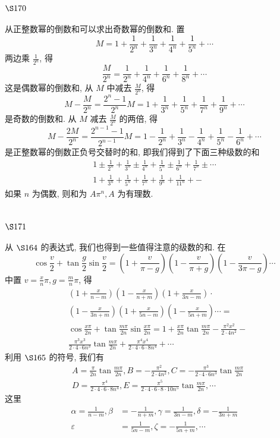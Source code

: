 \section{$\S 170$}

从正整数幂的倒数和可以求出奇数幂的倒数和. 置
\[
M=1+\frac{1}{2^{n}}+\frac{1}{3^{n}}+\frac{1}{4^{n}}+\frac{1}{5^{n}}+\cdots
\]
两边乘 $\frac{1}{2^{n}}$, 得
\[
\frac{M}{2^{n}}=\frac{1}{2^{n}}+\frac{1}{4^{n}}+\frac{1}{6^{n}}+\frac{1}{8^{n}}+\cdots
\]
这是偶数幂的倒数和, 从 $M$ 中减去 $\frac{M}{2^{n}}$, 得
\[
M-\frac{M}{2^{n}}=\frac{2^{n}-1}{2^{n}} M=1+\frac{1}{3^{n}}+\frac{1}{5^{n}}+\frac{1}{7^{n}}+\frac{1}{9^{n}}+\cdots
\]
是奇数的倒数和. 从 $M$ 减去 $\frac{M}{2^{n}}$ 的两倍, 得
\[
M-\frac{2 M}{2^{n}}=\frac{2^{n-1}-1}{2^{n-1}} M=1-\frac{1}{2^{n}}+\frac{1}{3^{n}}-\frac{1}{4^{n}}+\frac{1}{5^{n}}-\frac{1}{6^{n}}+\cdots
\]
是正整数幂的倒数正负号交替时的和, 即我们得到了下面三种级数的和
\[
\begin{gathered}
1 \pm \frac{1}{2^{n}}+\frac{1}{3^{n}} \pm \frac{1}{4^{n}}+\frac{1}{5^{n}} \pm \frac{1}{6^{n}}+\frac{1}{7^{n}} \pm \cdots \\
1+\frac{1}{3^{n}}+\frac{1}{5^{n}}+\frac{1}{7^{n}}+\frac{1}{9^{n}}+\frac{1}{11^{n}}+-
\end{gathered}
\]
如果 $n$ 为偶数, 则和为 $A \pi^{n}, A$ 为有理数.

\section{$\S 171$}

从 $\S 164$ 的表达式, 我们也得到一些值得注意的级数的和. 在
\[
\cos \frac{v}{2}+\tan \frac{g}{2} \sin \frac{v}{2}=\left(1+\frac{v}{\pi-g}\right)\left(1-\frac{v}{\pi+g}\right)\left(1-\frac{v}{3 \pi-g}\right) \cdots
\]
中置 $v=\frac{x}{n} \pi, g=\frac{m}{n} \pi$, 得
\[
\begin{aligned}
& \left(1+\frac{x}{n-m}\right)\left(1-\frac{x}{n+m}\right)\left(1+\frac{x}{3 n-m}\right) \cdot \\
& \left(1-\frac{x}{3 n+m}\right)\left(1+\frac{x}{5 n-m}\right)\left(1-\frac{x}{5 n+m}\right) \cdots= \\
& \cos \frac{x \pi}{2 n}+\tan \frac{m \pi}{2 n} \sin \frac{x \pi}{2 n}=1+\frac{x \pi}{2 n} \tan \frac{m \pi}{2 n}-\frac{\pi^{2} x^{2}}{2 \cdot 4 n^{2}}- \\
& \frac{\pi^{3} x^{3}}{2 \cdot 4 \cdot 6 n^{3}} \tan \frac{m \pi}{2 n}+\frac{\pi^{4} x^{4}}{2 \cdot 4 \cdot 6 \cdot 8 n^{4}}+\cdots
\end{aligned}
\]
利用 $\S 165$ 的符号, 我们有
\[
\begin{aligned}
& A=\frac{\pi}{2 n} \tan \frac{m \pi}{2 n}, B=-\frac{\pi^{2}}{2 \cdot 4 n^{2}}, C=-\frac{\pi^{3}}{2 \cdot 4 \cdot 6 n^{3}} \tan \frac{m \pi}{2 n} \\
& D=\frac{\pi^{4}}{2 \cdot 4 \cdot 6 \cdot 8 n^{4}}, E=\frac{\pi^{5}}{2 \cdot 4 \cdot 6 \cdot 8 \cdot 10 n^{5}} \tan \frac{m \pi}{2 n}, \cdots
\end{aligned}
\]
这里
\[
\begin{aligned}
\alpha=\frac{1}{n-m}, \beta & =-\frac{1}{n+m}, \gamma=\frac{1}{3 n-m}, \delta=-\frac{1}{3 n+m} \\
\varepsilon & =\frac{1}{5 n-m}, \zeta=-\frac{1}{5 n+m}, \cdots
\end{aligned}
\]
